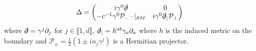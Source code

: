 \documentclass[english]{beamer}
\begin{document}
\begin{frame}[shrink=30]
\begin{itemize}
\begin{equation*}
\Delta = \begin{pmatrix}
i \gamma^0 \slashed{\partial}  & 0 \\
-c^{-1} \gamma^0 \mathcal{P}_- \cdot \vert_{\partial M}&  i\gamma^0 \slashed{\partial}_| \mathcal{P}_+
\end{pmatrix}
\end{equation*}
where $\slashed{\partial} = \gamma^j\partial_j$ for
$j \in \llbracket 1 , d \rrbracket$, $\slashed{\partial}_| = h^{ab} \gamma_{a} \partial_{a}$ where $h$ is the induced metric on the boundary and $
\mathcal{P}_\pm = \frac{1}{2}(1 \pm i n_j\gamma^j) $
is a Hermitian projector.

\end{itemize}

\end{frame}
\end{document}
